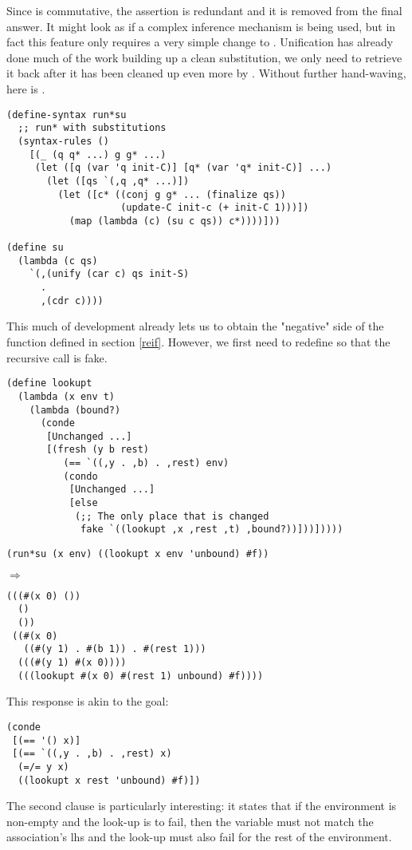 Since \code{==} is commutative, the assertion  is redundant and it is removed from the final answer. It might look as if a complex inference mechanism is being used, but in fact this feature only requires a very simple change to . Unification has already done much of the work building up a clean substitution, we only need to retrieve it back after it has been cleaned up even more by . Without further hand-waving, here is .
\begin{lstlisting}
(define-syntax run*su
  ;; run* with substitutions
  (syntax-rules ()
    [(_ (q q* ...) g g* ...)
     (let ([q (var 'q init-C)] [q* (var 'q* init-C)] ...)
       (let ([qs `(,q ,q* ...)])
         (let ([c* ((conj g g* ... (finalize qs))
                    (update-C init-c (+ init-C 1)))])
           (map (lambda (c) (su c qs)) c*))))]))

(define su
  (lambda (c qs)
    `(,(unify (car c) qs init-S)
      .
      ,(cdr c))))
\end{lstlisting}

This much of development already lets us to obtain the "negative" side of the  function defined in section \ref{reif}. However, we first need to redefine  so that the recursive call is fake.
\begin{lstlisting}
(define lookupt
  (lambda (x env t)
    (lambda (bound?)
      (conde
       [Unchanged ...]
       [(fresh (y b rest)
          (== `((,y . ,b) . ,rest) env)
          (condo
           [Unchanged ...]
           [else
            (;; The only place that is changed
             fake `((lookupt ,x ,rest ,t) ,bound?))]))]))))
\end{lstlisting}

\begin{lstlisting}
(run*su (x env) ((lookupt x env 'unbound) #f))
\end{lstlisting}
$\Rightarrow$
\begin{lstlisting}
(((#(x 0) ()) 
  () 
  ())
 ((#(x 0) 
   ((#(y 1) . #(b 1)) . #(rest 1)))
  (((#(y 1) #(x 0))))
  (((lookupt #(x 0) #(rest 1) unbound) #f))))
\end{lstlisting}
This response is akin to the goal:
\begin{lstlisting}
(conde
 [(== '() x)]
 [(== `((,y . ,b) . ,rest) x)
  (=/= y x)
  ((lookupt x rest 'unbound) #f)])
\end{lstlisting}
The second clause is particularly interesting: it states that if the environment is non-empty and the look-up is to fail, then the variable  must not match the association's lhs and the look-up must also fail for the rest of the environment.

